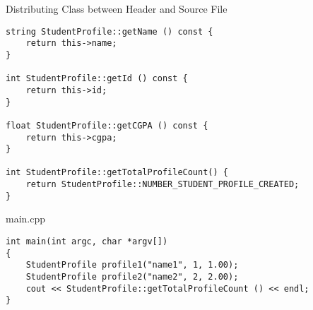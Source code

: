 \documentclass[newPxFont]{beamer}
\begin{document}
\begin{frame}{Distributing Class between Header and Source File}
\begin{verbatim}
string StudentProfile::getName () const {
    return this->name;
}

int StudentProfile::getId () const {
    return this->id;
}

float StudentProfile::getCGPA () const {
    return this->cgpa;
}

int StudentProfile::getTotalProfileCount() {
    return StudentProfile::NUMBER_STUDENT_PROFILE_CREATED;
}
\end{verbatim}

\alert{main.cpp}

\begin{verbatim}
int main(int argc, char *argv[])
{
    StudentProfile profile1("name1", 1, 1.00);
    StudentProfile profile2("name2", 2, 2.00);
    cout << StudentProfile::getTotalProfileCount () << endl;
}
\end{verbatim}



\end{frame}
\end{document}
